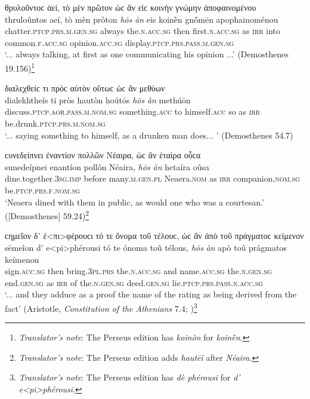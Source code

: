 \begin{exe}
\ex θρυλοῦντοϲ ἀεί, τὸ μὲν πρῶτον ὡϲ ἂν εἰϲ κοινὴν γνώμην ἀποφαινομένου\\
\gll thruloûntos aeí, tò mèn prôton \emph{hōs} \emph{àn} eis koinḕn gnṓmēn apophainoménou\\
chatter.\textsc{ptcp.prs.m.gen.sg} always the.\textsc{n.acc.sg} then first.\textsc{n.acc.sg} as \textsc{irr} into common.\textsc{f.acc.sg} opinion.\textsc{acc.sg} display.\textsc{ptcp.prs.pass.m.gen.sg}\\
\trans `... always talking, at first as one communicating his opinion ...' (Demosthenes 19.156)\footnote{\emph{Translator's note}: The Perseus edition has \textit{koinòn} for \textit{koinḕn}.}
\label{hosan47}
\end{exe}

\begin{exe}
\ex διαλεχθείϲ τι πρὸϲ αὑτὸν οὕτωϲ ὡϲ ἂν μεθύων\\
\gll dialekhtheís ti pròs hautòn hoútōs \emph{hōs} \emph{àn} methúōn\\
discuss.\textsc{ptcp.aor.pass.m.nom.sg} something.\textsc{acc} to himself.\textsc{acc} so as \textsc{irr} be.drunk.\textsc{ptcp.prs.m.nom.sg}\\
\trans `... saying something to himself, as a drunken man does... ' (Demosthenes 54.7)
\label{hosan48}
\end{exe}

\begin{exe}
\ex ϲυνεδείπνει ἐναντίον πολλῶν Νέαιρα, ὡϲ ἂν ἑταίρα οὖϲα\\
\gll sunedeípnei enantíon pollôn Néaira, \emph{hōs} \emph{àn} hetaíra oûsa\\
dine.together.\textsc{3sg.imp} before many.\textsc{m.gen.pl} Neaera.\textsc{nom} as \textsc{irr} companion.\textsc{nom.sg} be.\textsc{ptcp.prs.f.nom.sg}\\
\trans `Neaera dined with them in public, as would one who was a courtesan.' ({[}Demosthenes{]} 59.24)\footnote{\emph{Translator's note}: The Perseus edition adds \textit{hautēì} after \textit{Néaira}.}
\label{hosan49}
\end{exe}

\begin{exe}
\ex ϲημεῖον δ᾽ ἐ\textless{}πι\textgreater{}φέρουϲι τό τε ὄνομα τοῦ τέλουϲ, ὡϲ ἂν ἀπὸ τοῦ πράγματοϲ κείμενον\\
\gll sēmeîon d' e\textless{}pi\textgreater{}phérousi tó te ónoma toû télous, \emph{hōs} \emph{àn} apò toû prágmatos keímenon\\
sign.\textsc{acc.sg} then bring.\textsc{3pl.prs} the.\textsc{n.acc.sg} and name.\textsc{acc.sg} the.\textsc{n.gen.sg} end.\textsc{gen.sg} as \textsc{irr} of the.\textsc{n.gen.sg} deed.\textsc{gen.sg} lie.\textsc{ptcp.prs.pass.n.acc.sg}\\
\trans `... and they adduce as a proof the name of the rating as being derived from the fact' (Aristotle, \textit{Constitution of the Athenians} 7.4; \citealp[19, line 12]{Kenyon1891})\footnote{\emph{Translator's note}: The Perseus edition has \textit{dè phérousi} for \textit{d' e\textless{}pi\textgreater{}phérousi}.}
\label{hosan50}
\end{exe}

